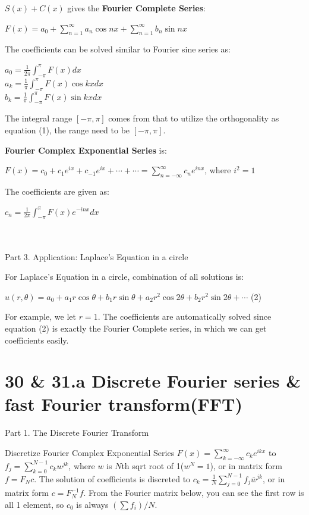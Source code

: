 \documentclass{article}
\newenvironment{nscenter}
{\parskip=0pt\par\nopagebreak\centering}
{\par\noindent\ignorespacesafterend}
\begin{document}
\begin{spacing}{1.5}
$S(x) + C(x)$ gives the {\bfseries Fourier Complete Series}:
\begin{nscenter}
	$F(x)=a_0 + \sum_{n=1}^{\infty}a_n \cos nx + \sum_{n=1}^{\infty}b_n \sin nx$
\end{nscenter}
The coefficients can be solved similar to Fourier sine series as:
\begin{nscenter}
	$a_0 = \frac{1}{2\pi} \int_{-\pi}^{\pi} F(x) dx$ \\
	$a_k = \frac{1}{\pi} \int_{-\pi}^{\pi} F(x) \cos kx dx$ \\
	$b_k = \frac{1}{\pi} \int_{-\pi}^{\pi} F(x) \sin kx dx$
\end{nscenter}
The integral range $[-\pi, \pi]$ comes from that to utilize the orthogonality as equation (1), the range need to be $[-\pi, \pi]$.

{\bfseries Fourier Complex Exponential Series} is:
\begin{nscenter}
	$F(x)=c_0 + c_1 e^{ix} + c_{-1} e^{ix} + \cdots + \cdots = \sum_{n=-\infty}^{\infty}c_n e^{inx}$, where $i^2=1$
\end{nscenter}
The coefficients are given as:
\begin{nscenter}
$c_n = \frac{1}{2\pi} \int_{-\pi}^{\pi} F(x) e^{-inx} dx$
\end{nscenter}
\\\\ Part 3.  Application: Laplace's Equation in a circle

For Laplace's Equation in a circle, combination of all solutions is:
\begin{nscenter}
	$u(r, \theta) = a_0 + a_1r\cos\theta + b_1r\sin\theta + a_2r^2\cos2\theta + b_2r^2\sin2\theta+\cdots$ (2)
\end{nscenter}
For example, we let $r=1$. The coefficients are automatically solved since equation (2) is exactly the Fourier Complete series, in which we can get coefficients easily.



\section*{30 \& 31.a Discrete Fourier series \& fast Fourier transform(FFT)}
Part 1. The Discrete Fourier Transform

Discretize Fourier Complex Exponential Series $F(x)=\sum_{k=-\infty}^{\infty}c_k e^{ikx}$ to $f_j=\sum_{k=0}^{N-1}c_kw^{jk}$, where $w$ is $N$th sqrt root of 1($w^N=1$), or in matrix form $f=F_Nc$. The solution of coefficients is discreted to $c_k=\frac{1}{N}\sum_{j=0}^{N-1}f_j\bar w ^{jk}$, or in matrix form $c=F^{-1}_Nf$. From the Fourier matrix below, you can see the first row is all 1 element, so $c_0$ is always $(\sum f_i) / N$.


\end{spacing}
\end{document}
